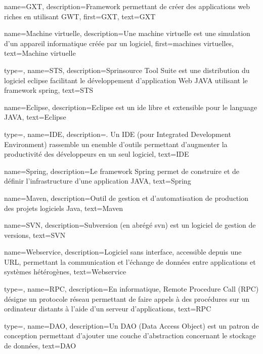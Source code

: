 {
    name={GXT},
    description={Framework permettant de créer des applications web riches en utilisant GWT},
    first={GXT},
    text={GXT}
}

{
    name={Machine virtuelle},
    description={Une machine virtuelle est une simulation d'un appareil informatique créée par un logiciel},
    first={machines virtuelles},
    text={Machine virtuelle}
}

{
    type=\acronymtype,
    name={STS},
    description={Sprinsource Tool Suite est une distribution du logiciel \gls{eclipse} facilitant le développement d'application Web JAVA utilisant le framework \gls{spring}},
    text={STS}
}

{
    name={Eclipse},
    description={Eclipse est un \gls{ide} libre et extensible pour le language JAVA},
    text={Eclipse}
}

{
    type=\acronymtype,
    name={IDE},
    description={. Un IDE (pour Integrated Development Environment) rassemble un enemble d'outils permettant d'augmenter la productivité des développeurs en un seul logiciel},
    text={IDE}
}

{
    name={Spring},
    description={Le framework Spring permet de construire et de définir l'infrastructure d'une application JAVA},
    text={Spring}
}

{
    name={Maven},
    description={Outil de gestion et d'automatisation de production des projets logiciels Java},
    text={Maven}
}

{
    name={SVN},
    description={Subversion (en abrégé svn) est un logiciel de gestion de versions\cite{wiki:svn}},
    text={SVN}
}


{
    name={Webservice},
    description={Logiciel sans interface, accessible depuis une URL, permettant la communication et l'échange de données entre applications et systèmes hétérogènes},
    text={Webservice}
}

{
    type=\acronymtype,
    name={RPC},
    description={En informatique, Remote Procedure Call (RPC) désigne un protocole réseau permettant de faire appels à des procédures sur un ordinateur distants à l'aide d'un serveur d'applications},
    text={RPC}
}

{
    type=\acronymtype,
    name={DAO},
    description={Un DAO (Data Access Object) est un patron de conception permettant d'ajouter une couche d'abstraction concernant le stockage de données},
    text={DAO}
}

